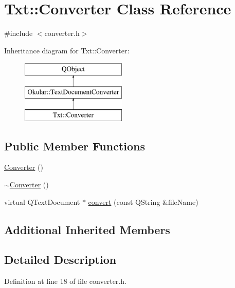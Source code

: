 \hypertarget{classTxt_1_1Converter}{\section{Txt\+:\+:Converter Class Reference}
\label{classTxt_1_1Converter}
}


{\ttfamily \#include $<$converter.\+h$>$}

Inheritance diagram for Txt\+:\+:Converter\+:\begin{figure}[H]
\begin{center}
\leavevmode
\includegraphics[height=3.000000cm]{classTxt_1_1Converter}
\end{center}
\end{figure}
\subsection*{Public Member Functions}
\begin{DoxyCompactItemize}
\item 
\hyperlink{classTxt_1_1Converter_a1de81f3e06093411e5d27ce882bc010f}{Converter} ()
\item 
\hyperlink{classTxt_1_1Converter_a9ecd05695a52c03158b81e544e13b996}{$\sim$\+Converter} ()
\item 
virtual Q\+Text\+Document $\ast$ \hyperlink{classTxt_1_1Converter_aa63e543977130604de659a4d725ee8bd}{convert} (const Q\+String \&file\+Name)
\end{DoxyCompactItemize}
\subsection*{Additional Inherited Members}


\subsection{Detailed Description}


Definition at line 18 of file converter.\+h.



